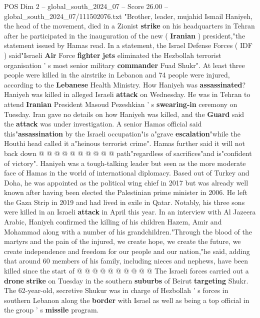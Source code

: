 \begin{textsample}{POS Dim 2 – global\_south\_2024\_07 – Score 26.00 – global\_south\_2024\_07/111502076.txt}  \label{ex:f2_pos_067}
"Brother, leader, mujahid Ismail Haniyeh, the head of the movement, died in a Zionist \textbf{strike} on his headquarters in Tehran after he participated in the inauguration of the new ( \textbf{Iranian} ) president,"the statement issued by Hamas read.
In a statement, the Israel Defense Forces ( IDF ) said"Israeli \textbf{Air} Force \textbf{fighter} \textbf{jets} eliminated the Hezbollah terrorist organisation ' s most senior military \textbf{commander} Fuad Shukr".
At least three people were killed in the airstrike in Lebanon and 74 people were injured, according to the \textbf{Lebanese} Health Ministry.
How Haniyeh was \textbf{assassinated}?
Haniyeh was killed in alleged Israeli \textbf{attack} on Wednesday.
He was in Tehran to attend \textbf{Iranian} President Masoud Pezeshkian ' s \textbf{swearing-in} ceremony on Tuesday.
Iran gave no details on how Haniyeh was killed, and the \textbf{Guard} said the \textbf{attack} was under investigation.
A senior Hamas official said this"\textbf{assassination} by the Israeli occupation"is a"grave \textbf{escalation}"while the Houthi head called it a"heinous terrorist crime".
Hamas further said it will not back down @ @ @ @ @ @ @ @ @ @ path"regardless of sacrifices"and is"confident of victory".
Haniyeh was a tough-talking leader but seen as the more moderate face of Hamas in the world of international diplomacy.
Based out of Turkey and Doha, he was appointed as the political wing chief in 2017 but was already well known after having been elected the Palestinian prime minister in 2006.
He left the Gaza Strip in 2019 and had lived in exile in Qatar.
Notably, his three sons were killed in an Israeli \textbf{attack} in April this year.
In an interview with Al Jazeera Arabic, Haniyeh confirmed the killing of his children Hazem, Amir and Mohammad along with a number of his grandchildren."Through the blood of the martyrs and the pain of the injured, we create hope, we create the future, we create independence and freedom for our people and our nation,"he said, adding that around 60 members of his family, including nieces and nephews, have been killed since the start of @ @ @ @ @ @ @ @ @ @ The Israeli forces carried out a \textbf{drone} \textbf{strike} on Tuesday in the southern \textbf{suburbs} of Beirut \textbf{targeting} Shukr.
The 62-year-old, secretive Shukur was in charge of Hezbollah ' s forces in southern Lebanon along the \textbf{border} with Israel as well as being a top official in the group ' s \textbf{missile} program.

\end{textsample}
